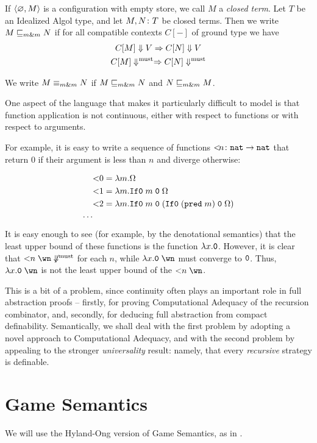 \documentclass[sigplan,10pt,review]{acmart}\settopmatter{printfolios=true,printccs=false,printacmref=false}
\begin{document}
If $\langle \varnothing , M \rangle$ is a configuration with empty store, we call $M$ a \emph{closed term}.  
Let $T$ be an Idealized Algol type, and let $M,N\colon T$ be closed terms.
Then we write $M\sqsubseteq_{m\&m} N$ if for all compatible contexts $C[-]$ of ground type we have
\begin{gather*}
  C[M]\Downarrow V \Rightarrow C[N] \Downarrow V\\
  C[M]\Downarrow^{\text{must}} \Rightarrow C[N] \Downarrow^{\text{must}}
\end{gather*}

We write $M\equiv_{m\&m} N$ if $M\sqsubseteq_{m\&m} N$ and $N\sqsubseteq_{m\&m} M$.

One aspect of the language that makes it particularly difficult to model is that function application is not continuous, either with respect to functions or with respect to arguments.  

For example, it is easy to write a sequence of functions ${<}\!n \colon {\mathtt{nat}} \to {\mathtt{nat}}$ that return $0$ if their argument is less than $n$ and diverge otherwise:

\begin{align*}
  &{<}0 = \lambda m.\Omega \\
  &{<}1 = \lambda m.{\mathtt{If0}\;} m\;{\mathtt{0}}\;\Omega \\
  &{<}2 = \lambda m.{\mathtt{If0}\;} m\;{\mathtt{0}}\;({\mathtt{If0}\;} ({\mathtt{pred\;}} m)\;{\mathtt{0}}\;\Omega)\\
  \cdots
\end{align*}
It is easy enough to see (for example, by the denotational semantics) that the least upper bound of these functions is the function $\lambda x.{\mathtt{0}}$.  
However, it is clear that ${<}n\;\wn\not\mustconverge$ for each $n$, while $\lambda x.\0\;\wn$ must converge to ${\mathtt{0}}$.  
Thus, $\lambda x.\0\;\wn$ is not the least upper bound of the ${<}n\;\wn$.

This is a bit of a problem, since continuity often plays an important role in full abstraction proofs -- firstly, for proving Computational Adequacy of the recursion combinator, and, secondly, for deducing full abstraction from compact definability.  
Semantically, we shall deal with the first problem by adopting a novel approach to Computational Adequacy, and with the second problem by appealing to the stronger \emph{universality} result: namely, that every \emph{recursive} strategy is definable.

\section{Game Semantics}

We will use the Hyland-Ong version of Game Semantics, as in \cite{SamsonGuyIAPassive}.
\end{document}
